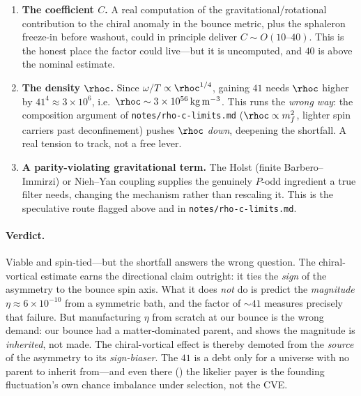 \begin{enumerate}
  \item \textbf{The coefficient $C$.} A real computation of the
    gravitational/rotational contribution to the chiral anomaly in the bounce
    metric, plus the sphaleron freeze-in before washout, could in principle deliver
    $C\sim O(10\text{--}40)$. This is the honest place the factor could live---but
    it is uncomputed, and $40$ is above the nominal estimate.
  \item \textbf{The density $\rhoc$.} Since $\omega/T\propto\rhoc^{1/4}$, gaining
    $41$ needs $\rhoc$ higher by $41^4\approx3\times10^{6}$, i.e.\
    $\rhoc\sim3\times10^{56}\,\mathrm{kg\,m^{-3}}$. This runs the \emph{wrong way}:
    the composition argument of \texttt{notes/rho-c-limits.md} ($\rhoc\propto
    m_f^2$, lighter spin carriers past deconfinement) pushes $\rhoc$ \emph{down},
    deepening the shortfall. A real tension to track, not a free lever.
  \item \textbf{A parity-violating gravitational term.} The Holst (finite
    Barbero--Immirzi) or Nieh--Yan coupling supplies the genuinely $P$-odd
    ingredient a true filter needs, changing the mechanism rather than rescaling it.
    This is the speculative route flagged above and in
    \texttt{notes/rho-c-limits.md}.
\end{enumerate}

\paragraph{Verdict.} Viable and spin-tied---but the shortfall answers the wrong
question. The chiral-vortical estimate earns the directional claim outright: it
ties the \emph{sign} of the asymmetry to the bounce spin axis. What it does
\emph{not} do is predict the \emph{magnitude} $\eta\approx6\times10^{-10}$ from a
symmetric bath, and the factor of $\sim41$ measures precisely that failure. But
manufacturing $\eta$ from scratch at our bounce is the wrong demand: our bounce
had a matter-dominated parent, and \Cref{sec:remnant} shows the magnitude is
\emph{inherited}, not made. The chiral-vortical effect is thereby demoted from the
\emph{source} of the asymmetry to its \emph{sign-biaser}. The $41$ is a debt only
for a universe with no parent to inherit from---and even there
() the likelier payer is the founding fluctuation's own chance
imbalance under selection, not the CVE.


